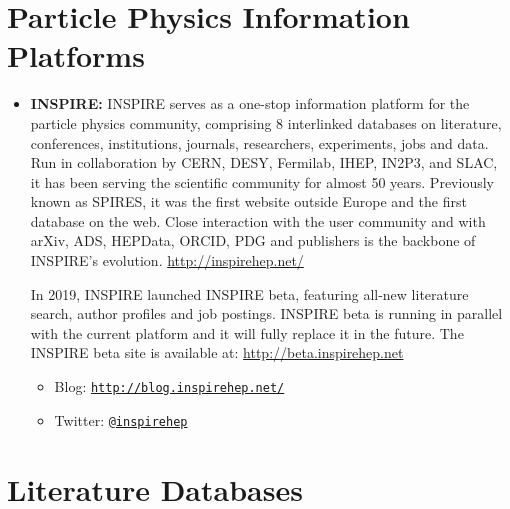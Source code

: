 \section{Particle Physics Information
Platforms}\label{databases:sec:platforms}

\begin{itemize}
\item
  \textbf{INSPIRE:} INSPIRE serves as a one-stop information platform
  for the particle physics community, comprising 8 interlinked databases
  on literature, conferences, institutions, journals, researchers,
  experiments, jobs and data. Run in collaboration by CERN, DESY,
  Fermilab, IHEP, IN2P3, and SLAC, it has been serving the scientific
  community for almost 50 years. Previously known as SPIRES, it was the
  first website outside Europe and the first database on the web. Close
  interaction with the user community and with arXiv, ADS, HEPData,
  ORCID, PDG and publishers is the backbone of INSPIRE's evolution.
  \url{http://inspirehep.net/}

  In 2019, INSPIRE launched INSPIRE beta, featuring all-new literature
  search, author profiles and job postings. INSPIRE beta is running in
  parallel with the current platform and it will fully replace it in the
  future. The INSPIRE beta site is available at:
  \url{http://beta.inspirehep.net}

  \begin{itemize}
  \tightlist
  \item
    Blog:
    \href{http://blog.inspirehep.net/}{\texttt{http://blog.inspirehep.net/}}
  \item
    Twitter: \href{https://twitter.com/inspirehep}{\texttt{@inspirehep}}
  \end{itemize}
\end{itemize}

\section{Literature Databases}\label{databases:sec:literature}

